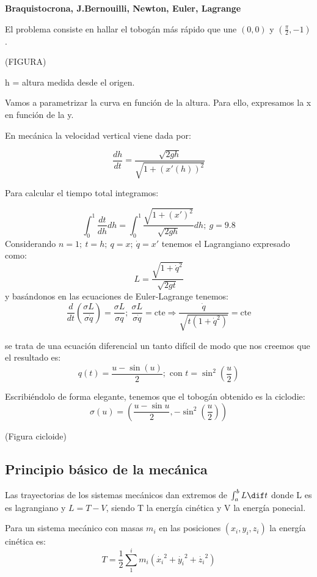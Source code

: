 \begin{example}
\textbf{Braquistocrona, J.Bernouilli, Newton, Euler, Lagrange}

El problema consiste en hallar el tobogán más rápido que une $(0,0)$ y $(\frac{\pi}{2},-1)$.

(FIGURA)

h = altura medida desde el origen.

Vamos a parametrizar la curva en función de la altura. Para ello, expresamos la x en función de la y.

En mecánica la velocidad vertical viene dada por:

$$\frac{dh}{dt} = \frac{\sqrt{2gh}}{\sqrt{1+(x'(h))^2}}$$

Para calcular el tiempo total integramos:

$$\int_0^1 \frac{dt}{dh} dh = \int_0^1 \frac{\sqrt{1 + (x')^2}}{\sqrt{2gh}} dh; \  g = 9.8$$
Considerando $n=1; \  t=h; \  q=x; \   \dot{q}=x'$ tenemos el Lagrangiano expresado como:
$$L = \frac{\sqrt{1+\dot{q}^2}}{\sqrt{2gt}} $$
y basándonos en las ecuaciones de Euler-Lagrange tenemos:
$$\frac{d}{dt} \left(\frac{\sigma L}{\sigma \dot{q}}\right) = \frac{\sigma L}{\sigma q}; \  \frac{\sigma L}{\sigma \dot{q}} = \text{cte} \Rightarrow \frac{\dot{q}}{\sqrt{t(1+\dot{q}^2)}} = \text{cte} $$

se trata de una ecuación diferencial un tanto difícil de modo que nos creemos que el resultado es:
$$ q(t) = \frac{u - \sin(u)}{2}; \text{ con } t=\sin^2\left(\frac{u}{2}\right) $$

Escribiéndolo de forma elegante, tenemos que el tobogán obtenido es la ciclodie:
$$ \sigma (u) = \left( \frac{u - \sin{u}}{2}, -\sin^2\left(\frac{u}{2}\right) \right) $$

(Figura cicloide)




\end{example}


\subsection{Principio básico de la mecánica}
\begin{theorem}
	Las trayectorias de los sistemas mecánicos dan extremos de $\int_a^b L \dif t$ donde L es es lagrangiano y $L= T-V$, siendo T la energía cinética y V la energía ponecial. 
\end{theorem}
\begin{defn}
	Para un sistema mecánico con masas $m_i$ en las posiciones $(x_i,y_i,z_i)$ la energía cinética es:$$T = \frac{1}{2} \sum_{1}^{i} m_i(\dot{x_i}^2 + \dot{y_i}^2 + \dot{z_i}^2)$$
\end{defn}

